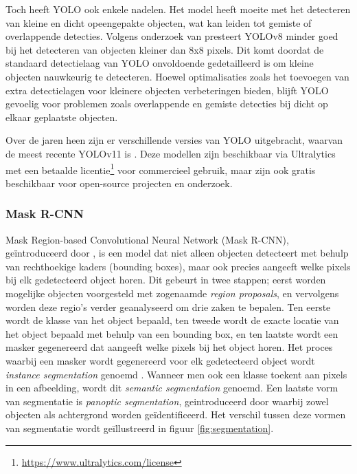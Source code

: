 Toch heeft YOLO ook enkele nadelen. Het model heeft moeite met het detecteren van kleine en dicht opeengepakte objecten, wat kan leiden tot gemiste of overlappende detecties. 
Volgens onderzoek van \textcite{Huang2024} presteert YOLOv8 minder goed bij het detecteren van objecten kleiner dan 8x8 pixels. 
Dit komt doordat de standaard detectielaag van YOLO onvoldoende gedetailleerd is om kleine objecten nauwkeurig te detecteren. 
Hoewel optimalisaties zoals het toevoegen van extra detectielagen voor kleinere objecten verbeteringen bieden, blijft YOLO gevoelig voor problemen zoals overlappende en gemiste detecties bij dicht op elkaar geplaatste objecten.

Over de jaren heen zijn er verschillende versies van YOLO uitgebracht, waarvan de meest recente YOLOv11 is \autocite{Khanam2024}.
Deze modellen zijn beschikbaar via Ultralytics met een betaalde licentie\footnote{\url{https://www.ultralytics.com/license}} voor commercieel gebruik, maar zijn ook gratis beschikbaar voor open-source projecten en onderzoek.

\subsubsection{Mask R-CNN}

Mask Region-based Convolutional Neural Network (Mask R-CNN), geïntroduceerd door \textcite{He2018}, is een model dat niet alleen objecten detecteert met behulp van rechthoekige kaders (bounding boxes), 
maar ook precies aangeeft welke pixels bij elk gedetecteerd object horen. Dit gebeurt in twee stappen; eerst worden mogelijke objecten voorgesteld met zogenaamde \textit{region proposals}, en vervolgens
worden deze regio's verder geanalyseerd om drie zaken te bepalen. Ten eerste wordt de klasse van het object bepaald, ten tweede wordt de exacte locatie van het object bepaald met behulp van een bounding box, en ten laatste
wordt een masker gegenereerd dat aangeeft welke pixels bij het object horen. Het proces waarbij een masker wordt gegenereerd voor elk gedetecteerd object wordt \textit{instance segmentation} genoemd \autocite{Hafiz2020}.
Wanneer men ook een klasse toekent aan pixels in een afbeelding, wordt dit \textit{semantic segmentation} genoemd. Een laatste vorm van segmentatie is \textit{panoptic segmentation}, geintroduceerd door \textcite{Kirillov2019} waarbij zowel objecten als achtergrond worden geïdentificeerd.
Het verschil tussen deze vormen van segmentatie wordt geïllustreerd in figuur \ref{fig:segmentation}.

